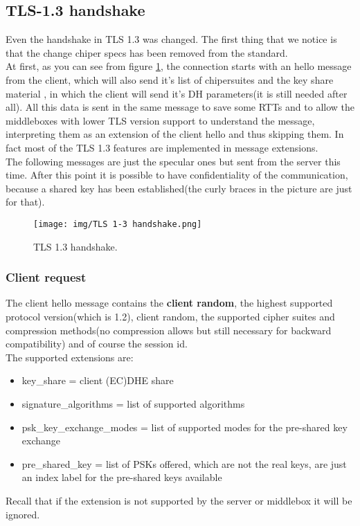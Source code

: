\subsection{TLS-1.3 handshake}
Even the handshake in TLS 1.3 was changed. The first thing that we
notice is that the change chiper specs has been removed from the
standard.\\
At first, as you can see from figure \ref{fig:tls-1.3-handshake}, the
connection starts with an hello message from the client, which will
also send it's list of chipersuites and the key share material , in
which the client will send it's DH parameters(it is still needed after
all). All this data is sent in the same message to save some RTTs and
to allow the middleboxes with lower TLS version support to understand 
the message, interpreting them as an extension of the client hello and
thus skipping them. In fact most of the TLS 1.3 features are 
implemented in message extensions.\\
The following messages are just the specular ones but sent from the
server this time. After this point it is possible to have
confidentiality of the communication, because a shared key has been
established(the curly braces in the picture are just for that).\\

\begin{figure}[H]
  \centering
  \texttt{[image: img/TLS 1-3 handshake.png]}
  \caption{TLS 1.3 handshake.}
  \label{fig:tls-1.3-handshake}
\end{figure}

\subsubsection{Client request}
The client hello message contains the \textbf{client random}, the
highest supported protocol version(which is 1.2), client random, the
supported cipher suites and compression methods(no compression allows
but still necessary for backward compatibility) and of course the
session id.\\
The supported extensions are: 


\begin{itemize}
  \item key\_share = client (EC)DHE share
  \item signature\_algorithms = list of supported algorithms
  \item psk\_key\_exchange\_modes = list of supported modes for the
    pre-shared key exchange
  \item pre\_shared\_key = list of PSKs offered, which are not
    the real keys, are just an index label for the pre-shared keys
    available
\end{itemize}
Recall that if the extension is not supported by the server or
middlebox it will be ignored.
